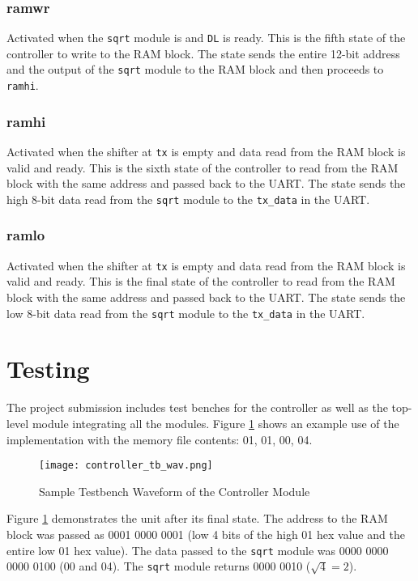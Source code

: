 \documentclass[paper=usletter, fontsize=12pt]{article}
\begin{document}
            \subsubsection{ramwr} Activated when the \texttt{sqrt} module is
            and \texttt{DL} is ready. This is the fifth state of the controller
            to write to the RAM block. The state sends the entire 12-bit
            address and the output of the \texttt{sqrt} module to the RAM block
            and then proceeds to \texttt{ramhi}.

            \subsubsection{ramhi} Activated when the shifter at \texttt{tx} is
            empty and data read from the RAM block is valid and ready. This is
            the sixth state of the controller to read from the RAM block with
            the same address and passed back to the UART. The state sends the
            high 8-bit data read from the \texttt{sqrt} module to the
            \texttt{tx\_data} in the UART.

            \subsubsection{ramlo} Activated when the shifter at \texttt{tx} is
            empty and data read from the RAM block is valid and ready. This is
            the final state of the controller to read from the RAM block with
            the same address and passed back to the UART. The state sends the
            low 8-bit data read from the \texttt{sqrt} module to the
            \texttt{tx\_data} in the UART.

    \newpage
    \section{Testing} The project submission includes test benches for the
    controller as well as the top-level module integrating all the modules.
    Figure \ref{fig:tbwav} shows an example use of the implementation with the
    memory file contents: 01, 01, 00, 04.

    \begin{figure}[ht]
        \begin{center}
            \texttt{[image: controller\_tb\_wav.png]}
            \caption{Sample Testbench Waveform of the Controller Module}
            \label{fig:tbwav}
        \end{center}
    \end{figure}

    Figure \ref{fig:tbwav} demonstrates the unit after its final state. The
    address to the RAM block was passed as 0001 0000 0001 (low 4 bits of the
    high 01 hex value and the entire low 01 hex value). The data passed to the
    \texttt{sqrt} module was 0000 0000 0000 0100 (00 and 04). The \texttt{sqrt}
    module returns 0000 0010 ($\sqrt{\text{4}}=\text{2}$).
\end{document}
